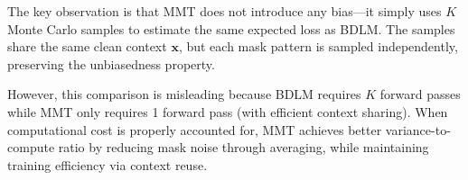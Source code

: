 \begin{remark}
The key observation is that MMT does not introduce any bias—it simply uses $K$ Monte Carlo samples to estimate the same expected loss as BDLM. The samples share the same clean context $\mathbf{x}$, but each mask pattern is sampled independently, preserving the unbiasedness property.
\end{remark}

However, this comparison is misleading because BDLM requires $K$ forward passes while MMT only requires 1 forward pass (with efficient context sharing). When computational cost is properly accounted for, MMT achieves better variance-to-compute ratio by reducing mask noise through averaging, while maintaining training efficiency via context reuse.
